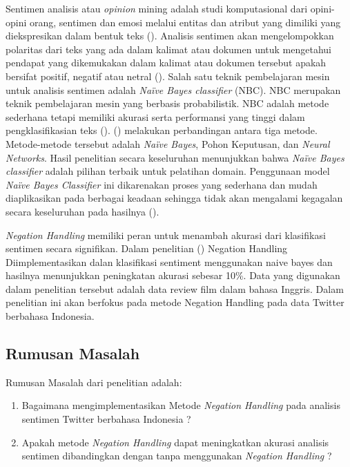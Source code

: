 Sentimen analisis atau \textit{opinion} mining adalah studi komputasional dari opini-opini orang, sentimen dan emosi melalui entitas dan atribut yang dimiliki yang diekspresikan dalam bentuk teks \citeauthor{LIU2012} (\cite*{LIU2012}). Analisis sentimen akan mengelompokkan polaritas dari teks yang ada dalam kalimat atau dokumen untuk mengetahui pendapat yang dikemukakan dalam kalimat atau dokumen tersebut apakah bersifat positif, negatif atau netral \cite{Pang+Lee+Vaithyanathan:02a} (\cite*{Pang+Lee+Vaithyanathan:02a}). Salah satu teknik pembelajaran mesin untuk analisis sentimen adalah \textit{Naïve Bayes classifier} (NBC). NBC merupakan teknik pembelajaran mesin yang berbasis probabilistik. NBC adalah metode sederhana tetapi memiliki akurasi serta performansi yang tinggi dalam pengklasifikasian teks (\cite{key:article}). \citeauthor{cogprints6708} (\citeauthor*{cogprints6708}) melakukan perbandingan antara tiga metode. Metode-metode tersebut adalah \textit{Naïve Bayes}, Pohon Keputusan, dan \textit{Neural Networks}. Hasil penelitian secara keseluruhan menunjukkan bahwa \textit{Naïve Bayes classifier} adalah pilihan terbaik untuk pelatihan domain. Penggunaan model \textit{Naïve Bayes Classifier} ini dikarenakan proses yang sederhana dan mudah diaplikasikan pada berbagai keadaan sehingga tidak akan mengalami kegagalan secara keseluruhan pada hasilnya (\cite{MANNING2008}).

\textit{Negation Handling} memiliki peran untuk menambah akurasi dari klasifikasi sentimen secara signifikan. Dalam penelitian \citeauthor{NARAYANAN2013} (\citeauthor*{NARAYANAN2013}) Negation Handling Diimplementasikan dalan klasifikasi sentiment menggunakan naive bayes dan hasilnya menunjukkan peningkatan akurasi sebesar 10\%. Data yang digunakan dalam penelitian tersebut adalah data review film dalam bahasa Inggris. Dalam penelitian ini akan berfokus pada metode Negation Handling pada data Twitter berbahasa Indonesia.


\subsection*{Rumusan Masalah}
Rumusan Masalah dari penelitian adalah:
\begin{enumerate}[noitemsep] 
	\item Bagaimana mengimplementasikan Metode \textit{Negation Handling} pada analisis sentimen Twitter berbahasa Indonesia ?
	\item Apakah metode \textit{Negation Handling} dapat meningkatkan akurasi analisis sentimen dibandingkan dengan tanpa menggunakan \textit{Negation Handling} ?
\end{enumerate}


